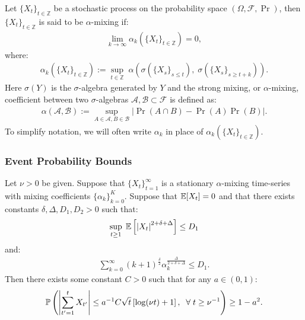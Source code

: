 \begin{definition}\label{def:alpha-mixing}
Let $\{X_t\}_{t\in \mathbb{Z}}$ be a stochastic process on the probability space $(\Omega, \mathcal{F}, \Pr)$, then $\{X_t\}_{t\in \mathbb{Z}}$ is said to be $\alpha$-mixing if:
\begin{align*}
    \lim_{k\to\infty} \alpha_k(\{X_t\}_{t\in\mathbb{Z}}) = 0,
\end{align*}
where:
\begin{align*}
    \alpha_k(\{X_t\}_{t\in\mathbb{Z}}) := \sup_{t\in\mathbb{Z}} \; \alpha\left(\sigma(\{X_s\}_{s \leq t}), \; \sigma(\{X_s\}_{s \geq t + k})\right).
\end{align*}
Here $\sigma(Y)$ is the $\sigma$-algebra generated by $Y$ and the strong mixing, or $\alpha$-mixing, coefficient between two $\sigma$-algebras $\mathcal{A}, \mathcal{B} \subset \mathcal{F}$ is defined as:
\begin{align*}
    \alpha(\mathcal{A}, \mathcal{B}) := \sup_{A\in\mathcal{A}, B\in\mathcal{B}} |\Pr(A \cap B) - \Pr(A)\Pr(B)|.
\end{align*}
To simplify notation, we will often write $\alpha_k$ in place of $\alpha_k(\{X_t\}_{t\in\mathbb{Z}})$.
\end{definition}

\subsubsection{Event Probability Bounds}

\begin{lemma}\label{lemma:Padilla23}
Let $\nu > 0$ be given. Suppose that $\{X_t\}_{t=1}^\infty$ is a stationary $\alpha$-mixing time-series with mixing coefficients $\{\alpha_k\}_{k=0}^K$. Suppose that $\mathbb{E}[X_t] = 0$ and that there exists constants $\delta, \Delta, D_1, D_2 > 0$ such that:
\begin{align*}
    \sup_{t \geq 1}\; \mathbb{E}\left[\left|X_t\right|^{2+\delta+\Delta}\right] \leq D_1 
\end{align*}
and:
\begin{align*}
    \sum_{k=0}^\infty (k+1)^{\frac{\delta}{2}} \alpha_k^{\frac{\Delta}{2+\delta+\Delta}} \leq D_1.
\end{align*}
Then there exists some constant $C > 0$ such that for any $a \in (0,1)$:
\begin{align*}
    \mathbb{P} \left(\left|\sum_{t'=1}^t X_{t'}\right| \leq a^{-1}C\sqrt{t}\left[\log (\nu t) + 1\right], \;\;\forall\; t\geq \nu^{-1}\right) 
    \geq 1 - a^2.
\end{align*}
\end{lemma}

